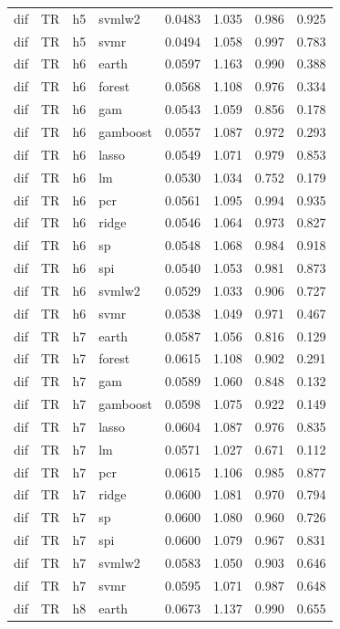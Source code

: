\begin{ThreePartTable}
\begin{longtable}[t]{llclcccc}
dif & TR & h5 & svmlw2 & 0.0483 & 1.035 & 0.986 & 0.925\\
dif & TR & h5 & svmr & 0.0494 & 1.058 & 0.997 & 0.783\\
\addlinespace
dif & TR & h6 & earth & 0.0597 & 1.163 & 0.990 & 0.388\\
dif & TR & h6 & forest & 0.0568 & 1.108 & 0.976 & 0.334\\
dif & TR & h6 & gam & 0.0543 & 1.059 & 0.856 & 0.178\\
dif & TR & h6 & gamboost & 0.0557 & 1.087 & 0.972 & 0.293\\
dif & TR & h6 & lasso & 0.0549 & 1.071 & 0.979 & 0.853\\
dif & TR & h6 & lm & 0.0530 & 1.034 & 0.752 & 0.179\\
dif & TR & h6 & pcr & 0.0561 & 1.095 & 0.994 & 0.935\\
dif & TR & h6 & ridge & 0.0546 & 1.064 & 0.973 & 0.827\\
dif & TR & h6 & sp & 0.0548 & 1.068 & 0.984 & 0.918\\
dif & TR & h6 & spi & 0.0540 & 1.053 & 0.981 & 0.873\\
dif & TR & h6 & svmlw2 & 0.0529 & 1.033 & 0.906 & 0.727\\
dif & TR & h6 & svmr & 0.0538 & 1.049 & 0.971 & 0.467\\
\addlinespace
dif & TR & h7 & earth & 0.0587 & 1.056 & 0.816 & 0.129\\
dif & TR & h7 & forest & 0.0615 & 1.108 & 0.902 & 0.291\\
dif & TR & h7 & gam & 0.0589 & 1.060 & 0.848 & 0.132\\
dif & TR & h7 & gamboost & 0.0598 & 1.075 & 0.922 & 0.149\\
dif & TR & h7 & lasso & 0.0604 & 1.087 & 0.976 & 0.835\\
dif & TR & h7 & lm & 0.0571 & 1.027 & 0.671 & 0.112\\
dif & TR & h7 & pcr & 0.0615 & 1.106 & 0.985 & 0.877\\
dif & TR & h7 & ridge & 0.0600 & 1.081 & 0.970 & 0.794\\
dif & TR & h7 & sp & 0.0600 & 1.080 & 0.960 & 0.726\\
dif & TR & h7 & spi & 0.0600 & 1.079 & 0.967 & 0.831\\
dif & TR & h7 & svmlw2 & 0.0583 & 1.050 & 0.903 & 0.646\\
dif & TR & h7 & svmr & 0.0595 & 1.071 & 0.987 & 0.648\\
\addlinespace
dif & TR & h8 & earth & 0.0673 & 1.137 & 0.990 & 0.655\\

\end{longtable}
\end{ThreePartTable}

